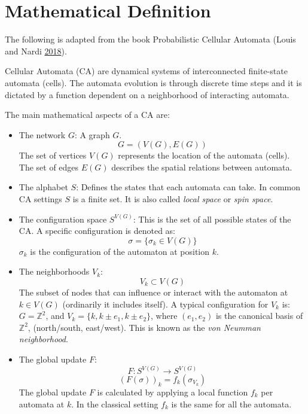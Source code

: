 \documentclass[
]{book}
\begin{document}
\hypertarget{mathematical-definition}{%
\section{Mathematical Definition}\label{mathematical-definition}}

The following is adapted from the book Probabilistic Cellular Automata (Louis and Nardi \protect\hyperlink{ref-louis2018probabilistic}{2018}).

Cellular Automata (CA) are dynamical systems of interconnected finite-state automata (cells). The automata evolution is through discrete time steps and it is dictated by a function dependent on a neighborhood of interacting automata.

The main mathematical aspects of a CA are:

\begin{itemize}
\item
  The network \(G\):
  A graph \(G\).
  \[ G = (V(G), E(G)) \]
  The set of vertices \(V(G)\) represents the location of the automata (cells). The set of edges \(E(G)\) describes the spatial relations between automata.
\item
  The alphabet \(S\):
  Defines the states that each automata can take. In common CA settings \(S\) is a finite set. It is also called \emph{local space} or \emph{spin space}.
\item
  The configuration space \(S^{V(G)}\):
  This is the set of all possible states of the CA. A specific configuration is denoted as:
  \[ \sigma = \{\sigma_k \in V(G)\} \]
  \(\sigma_k\) is the configuration of the automaton at position \(k\).
\item
  The neighborhoods \(V_k\):
  \[ V_k \subset  V(G) \]
  The subset of nodes that can influence or interact with the automaton at \(k \in V(G)\) (ordinarily it includes itself). A typical configuration for \(V_k\) is: \(G = \mathds{Z}^2\), and \(V_k = \{k, k \pm e_1, k \pm e_2\}\), where \((e_1, e_2)\) is the canonical basis of \(\mathds{Z}^2\), (north/south, east/west). This is known as the \emph{von Neumman neighborhood}.
\item
  The global update \(F\):
  \[ F: S^{V(G)} \rightarrow S^{V(G)} \]
  \[ (F(\sigma))_k = f_k(\sigma_{V_k}) \]
  The global update \(F\) is calculated by applying a local function \(f_k\) per automata at \(k\). In the classical setting \(f_k\) is the same for all the automata.
\end{itemize}
\end{document}
